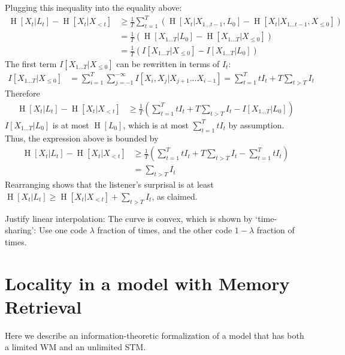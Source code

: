 \documentclass[11pt,letterpaper]{article}
\begin{document}
	Plugging this inequality into the equality above:
\begin{align*}
	\operatorname{H}[X_t | L_t] - \operatorname{H}[X_t | X_{<t}]& \geq \frac{1}{T} \sum_{t=1}^T ( \operatorname{H}[X_t|X_{1\dots t-1}, L_0] - \operatorname{H}[X_t | X_{1\dots t-1}, X_{\leq 0}]  )    \\
	& = \frac{1}{T} \left(\operatorname{H}[X_{1\dots T} | L_0] - \operatorname{H}[X_{1\dots T} | X_{\leq 0}]\right)  \\
	& = \frac{1}{T} \left(I[X_{1\dots T}|X_{\leq 0}] - I[X_{1\dots T}|L_0]\right) 
\end{align*}
	The first term $I[X_{1\dots T}|X_{\leq 0}]$ can be rewritten in terms of $I_t$:
	\begin{align*}
		I[X_{1\dots T}|X_{\leq 0}] &= \sum_{i=1}^T \sum_{j=-1}^{-\infty} I[X_i, X_j | X_{j+1}...X_{i-1}] = \sum_{t=1}^T t I_t + T \sum_{t > T} I_t
	\end{align*}
	Therefore
\begin{align*}
	\operatorname{H}[X_t | L_t] - \operatorname{H}[X_t | X_{<t}]& \geq \frac{1}{T} \left(\sum_{t=1}^T t I_t + T \sum_{t > T} I_t - I[X_{1\dots T}|L_0]\right) 
\end{align*}
	$I[X_{1\dots T}|L_0]$ is at most $\operatorname{H}[L_0]$, which is at most $\sum_{t=1}^T t I_t$ by assumption. Thus, the expression above is bounded by
	\begin{align*}
	\operatorname{H}[X_t | L_t] - \operatorname{H}[X_t | X_{<t}]& \geq \frac{1}{T} \left(\sum_{t=1}^T t I_t + T \sum_{t > T} I_t - \sum_{t=1}^T t I_t\right) \\
		&= \sum_{t > T} I_t
\end{align*}
	Rearranging shows that the listener's surprisal is at least $\operatorname{H}[X_t|L_t] \geq \operatorname{H}[X_t | X_{<t}] + \sum_{t > T} I_t$, as claimed.


Justify linear interpolation: The curve is convex, which is shown by `time-sharing': Use one code $\lambda$ fraction of times, and the other code $1-\lambda$ fraction of times.


\section{Locality in a model with Memory Retrieval}

Here we describe an information-theoretic formalization of a model that has both a limited WM and an unlimited STM.
\end{document}

